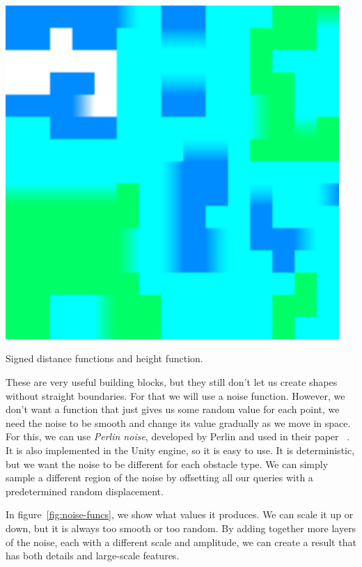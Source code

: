 \begin{center}
\begin{minipage}{.31\textwidth}
        \small{}
    \end{minipage}%
    \begin{minipage}{.31\textwidth}
        \centering
        \includegraphics[width=0.95\textwidth]{img/heights.png}
        \small{}
    \end{minipage}
    \caption{Signed distance functions and height function.}
    \label{fig:basic-fns}
\end{center}

These are very useful building blocks, but they still don't let us create shapes without straight boundaries.
For that we will use a noise function.
However, we don't want a function that just gives us some random value for each point, we need the noise to be smooth and change its value gradually as we move in space.
For this, we can use \emph{Perlin noise}, developed by Perlin and used in their paper ~\cite{PerlinNoise}.
It is also implemented in the Unity engine, so it is easy to use.
It is deterministic, but we want the noise to be different for each obstacle type.
We can simply sample a different region of the noise by offsetting all our queries with a predetermined random displacement.

In figure~\ref{fig:noise-funcs}, we show what values it produces.
We can scale it up or down, but it is always too smooth or too random.
By adding together more layers of the noise, each with a different scale and amplitude, we can create a result that has both details and large-scale features.

